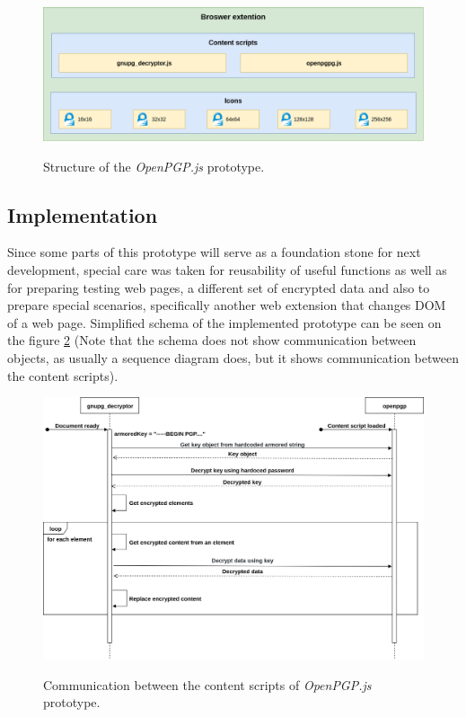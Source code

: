 \begin{figure}[H]
    \begin{center}
        \label{img:openpgpAnatomy}
        \includegraphics[width=1.0\textwidth]{obrazky-figures/prototype-openpgpjs.png}
        \caption{Structure of the \textit{OpenPGP.js} prototype.}
    \end{center}
\end{figure}

\subsection{Implementation}
Since some parts of this prototype will serve as a foundation stone for next development, special care was taken for reusability of useful functions as well as for preparing testing web pages, a different set of encrypted data and also to prepare special scenarios, specifically another web extension that changes DOM of a web page. Simplified schema of the implemented prototype can be seen on the figure \ref{img:openpgp-sequence} (Note that the schema does not show communication between objects, as usually a sequence diagram does, but it shows communication between the content scripts).
\begin{figure}[H]
    \begin{center}
        \label{img:openpgp-sequence}
        \includegraphics[width=1.3\textwidth,angle=90]{obrazky-figures/openpgp-sequence.png}
        \caption{Communication between the content scripts of \textit{OpenPGP.js} prototype.}
    \end{center}
\end{figure}


